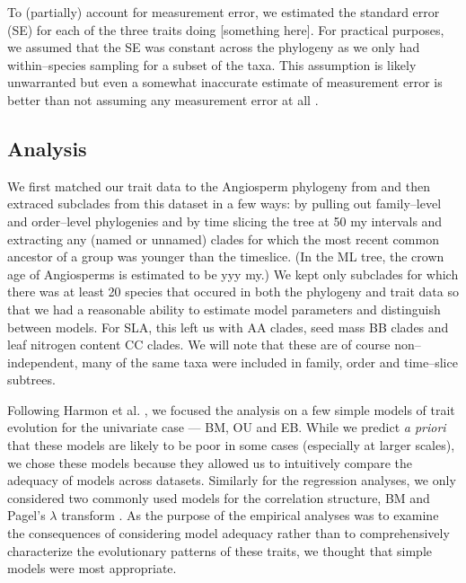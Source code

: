 \documentclass[a4paper,12pt]{article}
\begin{document}
To (partially) account for measurement error, we estimated the standard error (SE) for each of the three traits doing [something here]. For practical purposes, we assumed that the SE was constant across the phylogeny as we only had within--species sampling for a subset of the taxa. This assumption is likely unwarranted but even a somewhat inaccurate estimate of measurement error is better than not assuming any measurement error at all \citep{Hansen2012}.

\subsection{Analysis}

We first matched our trait data to the Angiosperm phylogeny from \citet{Zanne2013} and then extraced subclades from this dataset in a few ways: by pulling out family--level and order--level phylogenies and by time slicing the tree at 50 my intervals and extracting any (named or unnamed) clades for which the most recent common ancestor of a group was younger than the timeslice. (In the ML tree, the crown age of Angiosperms is estimated to be yyy my.) We kept only subclades for which there was at least 20 species that occured in both the phylogeny and trait data so that we had a reasonable ability to estimate model parameters and distinguish between models. For SLA, this left us with AA clades, seed mass BB clades and leaf nitrogen content CC clades. We will note that these are of course non--independent, many of the same taxa were included in family, order and time--slice subtrees. 

Following Harmon et al. \citep{Harmon2010}, we focused the analysis on a few simple models of trait evolution for the univariate case --- BM, OU and EB. While we predict \textit{a priori} that these models are likely to be poor in some cases (especially at larger scales), we chose these models because they allowed us to intuitively compare the adequacy of models across datasets. Similarly for the regression analyses, we only considered two commonly used models for the correlation structure, BM and Pagel's $\lambda$ transform \citep{Pagel1999, Freckleton2002}. As the purpose of the empirical analyses was to examine the consequences of considering model adequacy rather than to comprehensively characterize the evolutionary patterns of these traits, we thought that simple models were most appropriate.
\end{document}
